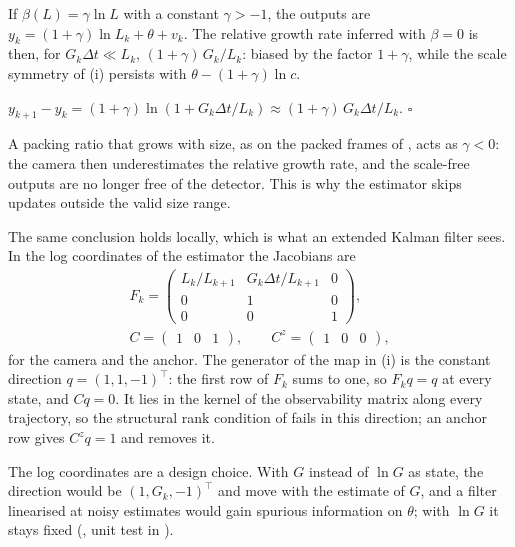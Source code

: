 \begin{corollary}\label{cor:beta}
If $\beta(L) = \gamma \ln L$ with a constant $\gamma > -1$, the outputs are $y_k = (1 + \gamma) \ln L_k + \theta + v_k$.
The relative growth rate inferred with $\beta = 0$ is then, for $G_k \Delta t \ll L_k$, $(1 + \gamma)\, G_k/L_k$: biased
by the factor $1 + \gamma$, while the scale symmetry of (i) persists with $\theta - (1 + \gamma) \ln c$.
\end{corollary}

\begin{pf}
$y_{k+1} - y_k = (1 + \gamma) \ln(1 + G_k \Delta t / L_k) \approx (1 + \gamma)\, G_k \Delta t / L_k$. \hfill$\square$
\end{pf}

A packing ratio that grows with size, as on the packed frames of , acts as $\gamma < 0$: the camera
then underestimates the relative growth rate, and the scale-free outputs are no longer free of the detector. This is
why the estimator skips updates outside the valid size range.

The same conclusion holds locally, which is what an extended Kalman filter sees. In the log coordinates of the
estimator the Jacobians are
\begin{equation}\label{eq:jacobians}
\begin{gathered}
F_k = \begin{pmatrix} L_k/L_{k+1} & G_k \Delta t/L_{k+1} & 0 \\ 0 & 1 & 0 \\ 0 & 0 & 1 \end{pmatrix}, \\
C = \begin{pmatrix} 1 & 0 & 1 \end{pmatrix}, \qquad C^z = \begin{pmatrix} 1 & 0 & 0 \end{pmatrix},
\end{gathered}
\end{equation}
for the camera and the anchor. The generator of the map in (i) is the constant direction $q = (1, 1, -1)^\top$: the
first row of $F_k$ sums to one, so $F_k q = q$ at every state, and $C q = 0$. It lies in the kernel of the
observability matrix along every trajectory, so the structural rank condition of \citet{HermannKrener1977} fails in
this direction; an anchor row gives $C^z q = 1$ and removes it.

The log coordinates are a design choice. With $G$ instead of $\ln G$ as state, the direction would be
$(1, G_k, -1)^\top$ and move with the estimate of $G$, and a filter linearised at noisy estimates would gain spurious
information on $\theta$; with $\ln G$ it stays fixed (, unit test in
).

